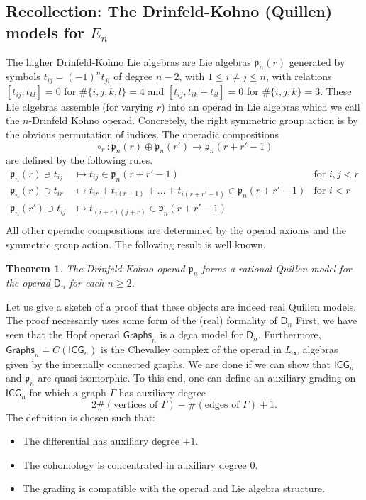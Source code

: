 \documentclass[a4paper]{amsart}
\theoremstyle{plain}
\newtheorem{thm}{Theorem}
\theoremstyle{definition}
\newcommand{\alg}[1]{\mathfrak{{#1}}}
\newcommand{\Graphs}{{\mathsf{Graphs}}}
\newcommand{\ICG}{\mathsf{ICG}}
\newcommand{\lD}{\mathsf{D}}
\newcommand{\DK}{{\alg p}}
\begin{document}
\subsection{Recollection: The Drinfeld-Kohno (Quillen) models for \texorpdfstring{$E_n$}{En}}\label{sec:drinfeld-kohno}
The higher Drinfeld-Kohno Lie algebras are Lie algebras $\DK_n(r)$ generated by symbols $t_{ij}=(-1)^n t_{ji}$ of degree $n-2$, with $1\leq i\neq j \leq n$, with relations $[t_{ij}, t_{kl}]=0$ for $\#\{i,j,k,l\}=4$ and $[t_{ij},t_{ik}+t_{il}]=0$ for $\#\{i,j,k\}=3$.
These Lie algebras assemble (for varying $r$) into an operad in Lie algebras which we call the $n$-Drinfeld Kohno operad.
Concretely, the right symmetric group action is by the obvious permutation of indices. The operadic compositions
\[
\circ_r: \DK_n(r) \oplus \DK_n(r') \to \DK_n(r+r'-1)
\]
are defined by the following rules.
\begin{align*}
 \DK_n(r) \ni t_{ij} &\mapsto t_{ij}  \in\DK_n(r+r'-1)& \text{for $i,j<r$} \\
 \DK_n(r) \ni t_{ir} &\mapsto t_{ir}+t_{i(r+1)}+\dots + t_{i(r+r'-1)}  \in\DK_n(r+r'-1) & \text{for $i<r$} \\
 \DK_n(r') \ni t_{ij} &\mapsto t_{(i+r)(j+r)}  \in\DK_n(r+r'-1) & \\ 
\end{align*}
All other operadic compositions are determined by the operad axioms and the symmetric group action.
The following result is well known.
\begin{thm}\label{thm:drinfeld-kohno}
The Drinfeld-Kohno operad $\DK_n$ forms a rational Quillen model for the operad $\lD_n$ for each $n\geq 2$.
\end{thm}
Let us give a sketch of a proof that these objects are indeed real Quillen models. The proof necessarily uses some form of the (real) formality of $\lD_n$
First, we have seen that the Hopf operad $\Graphs_n$ is a dgca model for $\lD_n$. Furthermore, $\Graphs_n=C(\ICG_n)$ is the Chevalley complex of the operad in $L_\infty$ algebras given by the internally connected graphs. We are done if we can show that $\ICG_n$ and $\DK_n$ are quasi-isomorphic. To this end, one can define an auxiliary grading on $\ICG_n$ for which a graph $\Gamma$ has auxiliary degree 
\[
2 \# (\text{vertices of }\Gamma) -  \# (\text{edges of }\Gamma) +1.
\]
The definition is chosen such that:
\begin{itemize}
\item The differential has auxiliary degree $+1$.
\item The cohomology is concentrated in auxiliary degree $0$.
\item The grading is compatible with the operad and Lie algebra structure.
\end{itemize}
\end{document}
